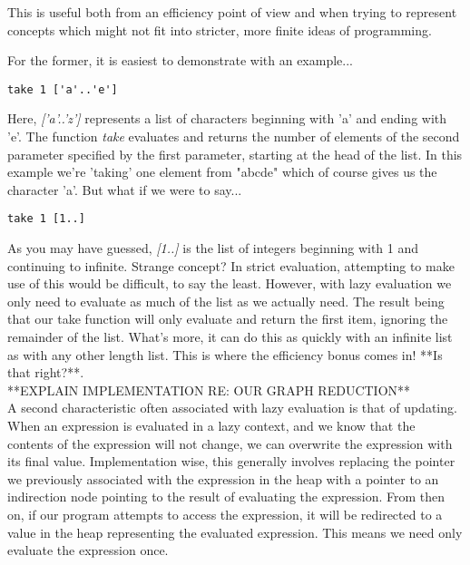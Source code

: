 This is useful both from an efficiency point of view and when trying to 
represent concepts which might not fit into stricter, more finite ideas of
programming. 

For the former, it is easiest to demonstrate with an example...
\begin{verbatim}
take 1 ['a'..'e']
\end{verbatim}
Here, \emph{['a'..'z']} represents a list of characters beginning with 'a' and 
ending with 'e'. The function \emph{take} evaluates and returns the number of
elements of the second parameter specified by the first parameter, starting at the
head of the list. In this example we're 'taking' one element from "abcde" which
of course gives us the character 'a'. But what if we were to say...
\begin{verbatim}
take 1 [1..]
\end{verbatim}
As you may have guessed, \emph{[1..]} is the list of integers beginning with 1
and continuing to infinite. Strange concept? In strict evaluation, attempting
to make use of this would be difficult, to say the least. However, with lazy 
evaluation we only need to evaluate as much of the list as we actually need.
The result being that our take function will only evaluate and return the 
first item, ignoring the remainder of the list. What's more, it can do this
as quickly with an infinite list as with any other length list. This is where the
efficiency bonus comes in! **Is that right?**. \\


**EXPLAIN IMPLEMENTATION RE: OUR GRAPH REDUCTION**  \\


A second characteristic often associated with lazy evaluation is that of 
updating. When an expression is evaluated in a lazy context, and we know
that the contents of the expression will not change, we can overwrite the
expression with its final value. Implementation wise, this generally involves
replacing the pointer we previously associated with the expression in the
heap with a pointer to an indirection node pointing to the result of 
evaluating the expression. From then on, if our program attempts to 
access the expression, it will be redirected to a value in the heap 
representing the evaluated expression. This means we need only evaluate
the expression once. 

